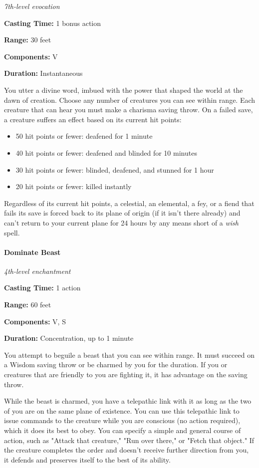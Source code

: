 \documentclass[
]{article}
\providecommand{\tightlist}{%
  \setlength{\itemsep}{0pt}\setlength{\parskip}{0pt}}
\begin{document}
\emph{7th-level evocation}

\textbf{Casting Time:} 1 bonus action

\textbf{Range:} 30 feet

\textbf{Components:} V

\textbf{Duration:} Instantaneous

You utter a divine word, imbued with the power that shaped the world at
the dawn of creation. Choose any number of creatures you can see within
range. Each creature that can hear you must make a charisma saving
throw. On a failed save, a creature suffers an effect based on its
current hit points:

\begin{itemize}
\tightlist
\item
  50 hit points or fewer: deafened for 1 minute
\item
  40 hit points or fewer: deafened and blinded for 10 minutes
\item
  30 hit points or fewer: blinded, deafened, and stunned for 1 hour
\item
  20 hit points or fewer: killed instantly
\end{itemize}

Regardless of its current hit points, a celestial, an elemental, a fey,
or a fiend that fails its save is forced back to its plane of origin (if
it isn't there already) and can't return to your current plane for 24
hours by any means short of a \emph{wish} spell.

\hypertarget{dominate-beast}{%
\paragraph{Dominate Beast}\label{dominate-beast}}

\emph{4th-level enchantment}

\textbf{Casting Time:} 1 action

\textbf{Range:} 60 feet

\textbf{Components:} V, S

\textbf{Duration:} Concentration, up to 1 minute

You attempt to beguile a beast that you can see within range. It must
succeed on a Wisdom saving throw or be charmed by you for the duration.
If you or creatures that are friendly to you are fighting it, it has
advantage on the saving throw.

While the beast is charmed, you have a telepathic link with it as long
as the two of you are on the same plane of existence. You can use this
telepathic link to issue commands to the creature while you are
conscious (no action required), which it does its best to obey. You can
specify a simple and general course of action, such as "Attack that
creature," "Run over there," or "Fetch that object." If the creature
completes the order and doesn't receive further direction from you, it
defends and preserves itself to the best of its ability.
\end{document}
